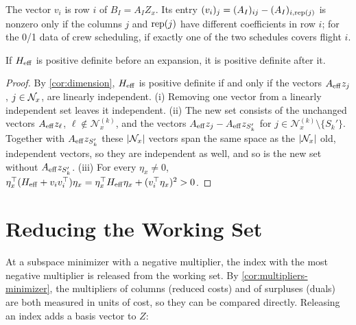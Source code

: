 The vector $v_i$ is row $i$ of $B_I = A_IZ_x$. Its entry $(v_i)_j = (A_I)_{ij} - (A_I)_{i,\operatorname{rep}(j)}$ is nonzero only if
the columns $j$ and $\operatorname{rep}(j)$ have different coefficients in row $i$; for the 0/1 data of crew
scheduling, if exactly one of the two schedules covers flight $i$.

\begin{prop} \label{prop:expand-pd}
If $H_{\mathrm{eff}}$ is positive definite before an expansion, it is positive definite after it.
\end{prop}

\begin{proof}
By \cref{cor:dimension}, $H_{\mathrm{eff}}$ is positive definite if and only if the vectors $A_{\mathrm{eff}} z_j$,
$j\in\mathcal{N}_x$, are linearly independent.
(i) Removing one vector from a linearly independent set leaves it independent.
(ii) The new set consists of the unchanged vectors $A_{\mathrm{eff}} z_\ell$,
$\ell\notin\mathcal{N}_x^{(k)}$, and the vectors $A_{\mathrm{eff}} z_j - A_{\mathrm{eff}} z_{S_k'}$ for
$j\in\mathcal{N}_x^{(k)}\setminus\{S_k'\}$. Together with $A_{\mathrm{eff}} z_{S_k'}$ these $|\mathcal{N}_x|$ vectors span the same
space as the $|\mathcal{N}_x|$ old, independent vectors, so they are independent as well, and so is the
new set without $A_{\mathrm{eff}} z_{S_k'}$.
(iii) For every $\eta_x\ne0$, $\eta_x^\top(H_{\mathrm{eff}} + v_iv_i^\top)\eta_x = \eta_x^\top H_{\mathrm{eff}}\eta_x +
(v_i^\top\eta_x)^2 > 0$.
\end{proof}


\section{Reducing the Working Set}
\label{sec:reducing}

At a subspace minimizer with a negative multiplier, the index with the most negative
multiplier is released from the working set. By \cref{cor:multipliers-minimizer}, the
multipliers of columns (reduced costs) and of surpluses (duals) are both measured in units
of cost, so they can be compared directly. Releasing an index adds a basis vector to $Z$:

